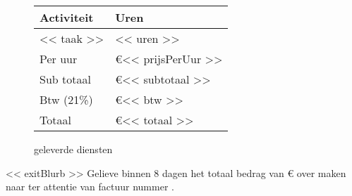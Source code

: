\documentclass{scrartcl}
\begin{document}
\begin{figure}[h]
  \centering
\begin{tabular}{l | l}
  Activiteit & Uren \\
  \hline
  << taak >> & << uren >> \\
  \hline
  Per uur & \euro << prijsPerUur >> \\
  Sub totaal & \euro << subtotaal  >> \\ %
  Btw (21\%) & \euro << btw >> \\
  Totaal & \euro << totaal >>
\end{tabular}
\caption{geleverde diensten}
\label{kosten}
\end{figure}

<< exitBlurb >>
Gelieve binnen 8 dagen het totaal bedrag van \euro {} over maken naar 
 ter attentie van factuur nummer .
\end{document}
